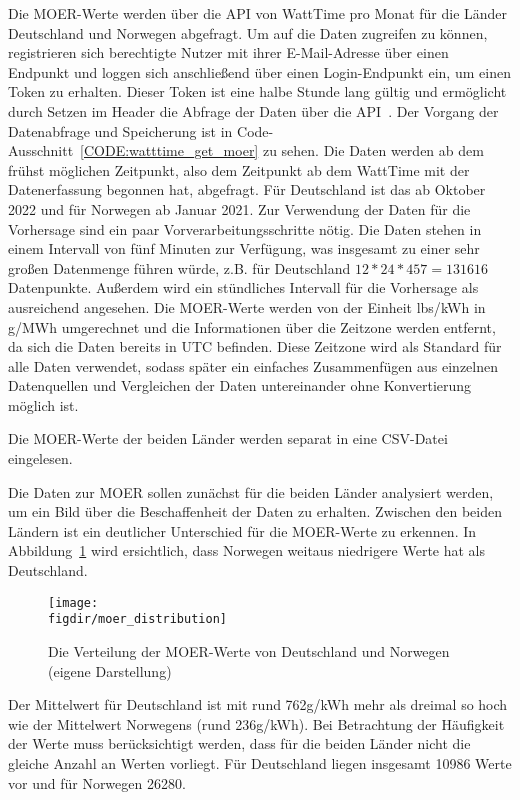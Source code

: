 Die \ac{MOER}-Werte werden über die \ac{API} von WattTime pro Monat für die Länder Deutschland und Norwegen abgefragt.
Um auf die Daten zugreifen zu können, registrieren sich berechtigte Nutzer mit ihrer E-Mail-Adresse über einen Endpunkt und loggen sich anschließend über einen Login-Endpunkt ein, um einen Token zu erhalten.
Dieser Token ist eine halbe Stunde lang gültig und ermöglicht durch Setzen im Header die Abfrage der Daten über die \ac{API}~\cite{.20240220T17:59:19.000Z}.
Der Vorgang der Datenabfrage und Speicherung ist in Code-Ausschnitt~\ref{CODE:watttime_get_moer} zu sehen.
Die Daten werden ab dem frühst möglichen Zeitpunkt, also dem Zeitpunkt ab dem WattTime mit der Datenerfassung begonnen hat, abgefragt.
Für Deutschland ist das ab Oktober 2022 und für Norwegen ab Januar 2021.
Zur Verwendung der Daten für die Vorhersage sind ein paar Vorverarbeitungsschritte nötig.
Die Daten stehen in einem Intervall von fünf Minuten zur Verfügung, was insgesamt zu einer sehr großen Datenmenge führen würde, z.B. für Deutschland $12 * 24 * 457 = 131 616$ Datenpunkte.
Außerdem wird ein stündliches Intervall für die Vorhersage als ausreichend angesehen.
Die \ac{MOER}-Werte werden von der Einheit lbs/\ac{kWh} in g/MWh umgerechnet und die Informationen über die Zeitzone werden entfernt, da sich die Daten bereits in \ac{UTC} befinden.
Diese Zeitzone wird als Standard für alle Daten verwendet, sodass später ein einfaches Zusammenfügen aus einzelnen Datenquellen und Vergleichen der Daten untereinander ohne Konvertierung möglich ist.

Die \ac{MOER}-Werte der beiden Länder werden separat in eine CSV-Datei eingelesen.

Die Daten zur \ac{MOER} sollen zunächst für die beiden Länder analysiert werden, um ein Bild über die Beschaffenheit der Daten zu erhalten.
Zwischen den beiden Ländern ist ein deutlicher Unterschied für die MOER-Werte zu erkennen.
In Abbildung~\ref{FIG:moer_distribution} wird ersichtlich, dass Norwegen weitaus niedrigere Werte hat als Deutschland.
\begin{figure}
 \caption{Die Verteilung der MOER-Werte von Deutschland und Norwegen (eigene Darstellung)}
 {\texttt{[image: \\figdir/moer\_distribution]}}
 \label{FIG:moer_distribution}
\end{figure}
Der Mittelwert für Deutschland ist mit rund 762g/kWh mehr als dreimal so hoch wie der Mittelwert Norwegens (rund 236g/kWh).
Bei Betrachtung der Häufigkeit der Werte muss berücksichtigt werden, dass für die beiden Länder nicht die gleiche Anzahl an Werten vorliegt.
Für Deutschland liegen insgesamt 10986 Werte vor und für Norwegen 26280.

